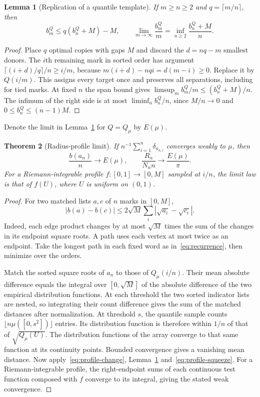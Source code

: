 \documentclass[11pt,letterpaper]{article}
\newtheorem{theorem}{Theorem}
\newtheorem{lemma}[theorem]{Lemma}
\theoremstyle{definition}\newtheorem{definition}[theorem]{Definition}
\theoremstyle{remark}\newtheorem{remark}[theorem]{Remark}
\begin{document}
\begin{lemma}[Replication of a quantile template]\label{lem:profile-copy}
If $m\ge n\ge2$ and $q=\lceil m/n\rceil$, then
\[
 b_m^Q\le q(b_n^Q+M)-M,\qquad
 \lim_{m\to\infty}\frac{b_m^Q}{m}=\inf_{n\ge2}\frac{b_n^Q+M}{n}.
\]
\end{lemma}
\begin{proof}
Place $q$ optimal copies with gaps $M$ and discard the $d=nq-m$
smallest donors. The $i$th remaining mark in sorted order has argument
$\lceil(i+d)/q\rceil/n\ge i/m$, because $m(i+d)-nqi=d(m-i)\ge0$.
Replace it by $Q(i/m)$. This assigns every target once and preserves
all separations, including for tied marks. At fixed $n$ the span bound
gives $\limsup_m b_m^Q/m\le(b_n^Q+M)/n$. The infimum of the right side
is at most $\liminf_n b_n^Q/n$, since $M/n\to0$ and
$0\le b_n^Q\le(n-1)M$.
\end{proof}

Denote the limit in Lemma~\ref{lem:profile-copy} for $Q=Q_\mu$ by $E(\mu)$.

\begin{theorem}[Radius-profile limit]\label{thm:profile-law}
If $n^{-1}\sum_{i=1}^n\delta_{a_{n,i}}$ converges weakly to $\mu$, then
\[
 \frac{b(a_n)}{n}\longrightarrow E(\mu),\qquad
 \frac{R_n}{N_n n}\longrightarrow\frac{E(\mu)}{\pi}.
\]
For a Riemann-integrable profile $f:[0,1]\to[0,M]$ sampled at $i/n$,
the limit law is that of $f(U)$, where $U$ is uniform on $(0,1)$.
\end{theorem}
\begin{proof}
For two matched lists $a,c$ of $n$ marks in $[0,M]$,
\begin{equation}\label{eq:profile-change}
 |b(a)-b(c)|\le2\sqrt M\sum_i|\sqrt{a_i}-\sqrt{c_i}|.
\end{equation}
Indeed, each edge product changes by at most $\sqrt M$ times the sum
of the changes in its endpoint square roots. A path uses each vertex
at most twice as an endpoint. Take the longest path in each fixed word
as in~\eqref{eq:recurrence}, then minimize over the orders.

Match the sorted square roots of $a_n$ to those of $Q_\mu(i/n)$.
Their mean absolute difference equals the integral over $[0,\sqrt M]$
of the absolute difference of the two empirical distribution functions.
At each threshold the two sorted indicator lists are nested, so
integrating their count difference gives the sum of the matched distances
after normalization. At threshold $s$, the quantile sample counts
$\lfloor n\mu([0,s^2])\rfloor$ entries. Its distribution function is
therefore within $1/n$ of that of $\sqrt{Q_\mu(U)}$. The distribution
functions of the array converge to that same function at its continuity
points. Bounded convergence gives a vanishing mean distance. Now
apply~\eqref{eq:profile-change}, Lemma~\ref{lem:profile-copy}
and~\eqref{eq:profile-squeeze}. For a Riemann-integrable profile, the
right-endpoint sums of each continuous test function composed with $f$
converge to its integral, giving the stated weak convergence.
\end{proof}
\end{document}
